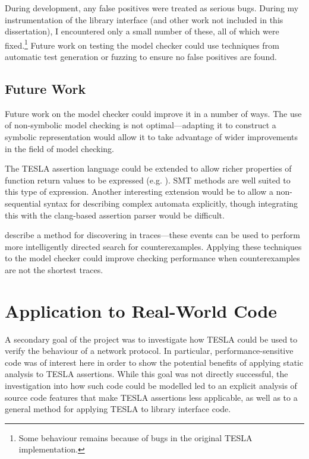 During development, any false positives were treated as serious bugs. During my
instrumentation of the \lwip{} library interface (and other work not included in
this dissertation), I encountered only a small number of these, all of which
were fixed.\footnote{Some  behaviour remains because of bugs
in the original TESLA implementation.} Future work on testing the model checker
could use techniques from automatic test generation or fuzzing to ensure no
false positives are found.

\subsection{Future Work}

Future work on the model checker could improve it in a number of ways. The use
of non-symbolic model checking is not optimal---adapting it to construct a
symbolic representation would allow it to take advantage of wider improvements
in the field of model checking. 

The TESLA assertion language could be extended to allow richer properties of
function return values to be expressed (e.g. ). SMT methods are well suited to this type
of expression. Another interesting extension would be to allow a non-sequential
syntax for describing complex automata explicitly, though integrating this with
the clang-based assertion parser would be difficult.

\textcite{kashyap_producing_2008} describe a method for discovering
 in traces---these events can be used to perform more
intelligently directed search for counterexamples. Applying these techniques to
the model checker could improve checking performance when counterexamples are
not the shortest traces.

\section{Application to Real-World Code} \label{sec:eval-app}

A secondary goal of the project was to investigate how TESLA could be used to
verify the behaviour of a network protocol. In particular, performance-sensitive
code was of interest here in order to show the potential benefits of applying
static analysis to TESLA assertions. While this goal was not directly
successful, the investigation into how such code could be modelled led to an
explicit analysis of source code features that make TESLA assertions less
applicable, as well as to a general method for applying TESLA to library
interface code.

